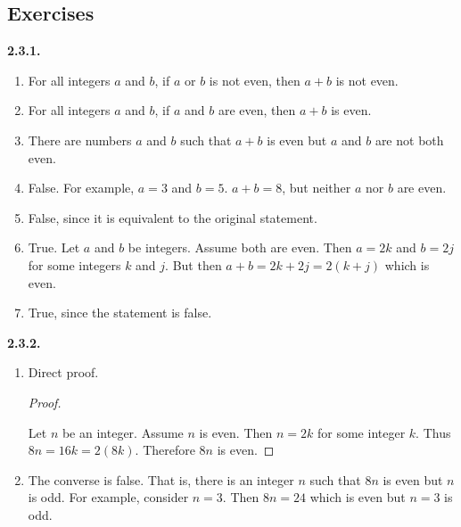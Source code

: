 \documentclass[10pt,]{book}
\theoremstyle{plain}
\theoremstyle{definition}
\theoremstyle{definition}
\theoremstyle{definition}
\theoremstyle{definition}
\numberwithin{equation}{chapter}
\begin{document}
\subsection*{ Exercises}
\noindent\textbf{2.3.1.} \hypertarget{p-1381}{}%
\leavevmode%
\begin{enumerate}[label=(\alph*)]
\item\hypertarget{li-651}{}\hypertarget{p-1382}{}%
For all integers \(a\) and \(b\), if \(a\) or \(b\) is not even, then \(a+b\) is not even.%
\item\hypertarget{li-652}{}\hypertarget{p-1383}{}%
For all integers \(a\) and \(b\), if \(a\) and \(b\) are even, then \(a+b\) is even.%
\item\hypertarget{li-653}{}\hypertarget{p-1384}{}%
There are numbers \(a\) and \(b\) such that \(a+b\) is even but \(a\) and \(b\) are not both even.%
\item\hypertarget{li-654}{}\hypertarget{p-1385}{}%
False. For example, \(a = 3\) and \(b = 5\). \(a+b = 8\), but neither \(a\) nor \(b\) are even.%
\item\hypertarget{li-655}{}\hypertarget{p-1386}{}%
False, since it is equivalent to the original statement.%
\item\hypertarget{li-656}{}\hypertarget{p-1387}{}%
True. Let \(a\) and \(b\) be integers. Assume both are even. Then \(a = 2k\) and \(b = 2j\) for some integers \(k\) and \(j\). But then \(a+b = 2k + 2j = 2(k+j)\) which is even.%
\item\hypertarget{li-657}{}\hypertarget{p-1388}{}%
True, since the statement is false.%
\end{enumerate}
%
\par\smallskip
\noindent\textbf{2.3.2.} \hypertarget{p-1393}{}%
\leavevmode%
\begin{enumerate}[label=(\alph*)]
\item\hypertarget{li-660}{}\hypertarget{p-1394}{}%
Direct proof. \begin{proof}\hypertarget{proof-32}{}
\hypertarget{p-1395}{}%
Let \(n\) be an integer. Assume \(n\) is even. Then \(n = 2k\) for some integer \(k\). Thus \(8n = 16k = 2(8k)\). Therefore \(8n\) is even.%
\end{proof}
%
\item\hypertarget{li-661}{}\hypertarget{p-1396}{}%
The converse is false. That is, there is an integer \(n\) such that \(8n\) is even but \(n\) is odd. For example, consider \(n = 3\). Then \(8n = 24\) which is even but \(n = 3\) is odd.%
\end{enumerate}
%
\par\smallskip
\end{document}
